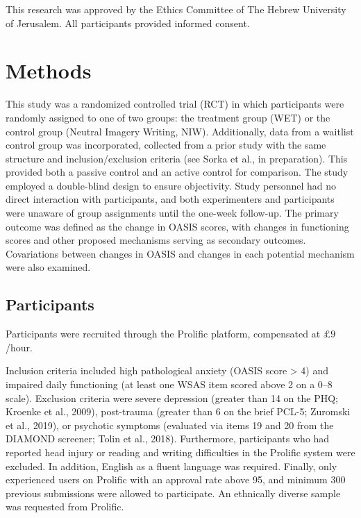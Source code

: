 \documentclass[
  man,floatsintext]{apa7}
\begin{document}
This research was approved by the Ethics Committee of The Hebrew University of Jerusalem.
All participants provided informed consent.

\section{Methods}\label{methods}

This study was a randomized controlled trial (RCT) in which participants were randomly assigned to one of two groups: the treatment group (WET) or the control group (Neutral Imagery Writing, NIW).
Additionally, data from a waitlist control group was incorporated, collected from a prior study with the same structure and inclusion/exclusion criteria (see Sorka et al., in preparation).
This provided both a passive control and an active control for comparison.
The study employed a double-blind design to ensure objectivity.
Study personnel had no direct interaction with participants, and both experimenters and participants were unaware of group assignments until the one-week follow-up.
The primary outcome was defined as the change in OASIS scores, with changes in functioning scores and other proposed mechanisms serving as secondary outcomes.
Covariations between changes in OASIS and changes in each potential mechanism were also examined.

\subsection{Participants}\label{participants}

Participants were recruited through the Prolific platform, compensated at \(\pounds 9\)/hour.

Inclusion criteria included high pathological anxiety (OASIS score \textgreater{} 4)
and impaired daily functioning (at least one WSAS item scored above 2 on a 0--8 scale).
Exclusion criteria were severe depression (greater than 14 on the PHQ; Kroenke et al., 2009), post-trauma (greater than 6 on the brief PCL-5; Zuromski et al., 2019), or psychotic symptoms (evaluated via items 19 and 20 from the DIAMOND screener; Tolin et al., 2018).
Furthermore, participants who had reported head injury or reading and writing difficulties in the Prolific system were excluded.
In addition, English as a fluent language was required.
Finally, only experienced users on Prolific with an approval rate above 95, and minimum 300 previous submissions were allowed to participate.
An ethnically diverse sample was requested from Prolific.
\end{document}
